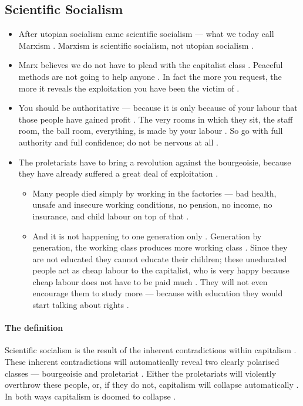 \subsection{Scientific Socialism}
\begin{itemize}
    \item After utopian socialism came scientific socialism --- what we today call Marxism . Marxism is scientific socialism, not utopian socialism .
    \item Marx believes we do not have to plead with the capitalist class . Peaceful methods are not going to help anyone . In fact the more you request, the more it reveals the exploitation you have been the victim of .
    \item You should be authoritative --- because it is only because of your labour that those people have gained profit . The very rooms in which they sit, the staff room, the ball room, everything, is made by your labour . So go with full authority and full confidence; do not be nervous at all .
    \item The proletariats have to bring a revolution against the bourgeoisie, because they have already suffered a great deal of exploitation .
    \begin{itemize}
        \item Many people died simply by working in the factories --- bad health, unsafe and insecure working conditions, no pension, no income, no insurance, and child labour on top of that .
        \item And it is not happening to one generation only . Generation by generation, the working class produces more working class . Since they are not educated they cannot educate their children; these uneducated people act as cheap labour to the capitalist, who is very happy because cheap labour does not have to be paid much . They will not even encourage them to study more --- because with education they would start talking about rights .
    \end{itemize}
\end{itemize}

\paragraph{The definition}
\begin{KeyConcept}
Scientific socialism is the result of the inherent contradictions within capitalism . These inherent contradictions will automatically reveal two clearly polarised classes --- bourgeoisie and proletariat . Either the proletariats will violently overthrow these people, or, if they do not, capitalism will collapse automatically . In both ways capitalism is doomed to collapse .
\end{KeyConcept}


